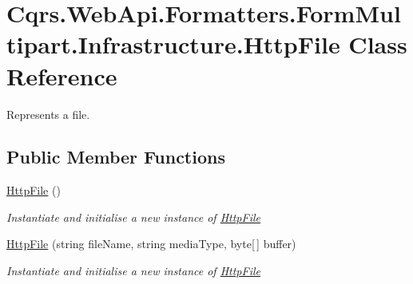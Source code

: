 \hypertarget{classCqrs_1_1WebApi_1_1Formatters_1_1FormMultipart_1_1Infrastructure_1_1HttpFile}{}\section{Cqrs.\+Web\+Api.\+Formatters.\+Form\+Multipart.\+Infrastructure.\+Http\+File Class Reference}
\label{classCqrs_1_1WebApi_1_1Formatters_1_1FormMultipart_1_1Infrastructure_1_1HttpFile}


Represents a file.  


\subsection*{Public Member Functions}
\begin{DoxyCompactItemize}
\item 
\hyperlink{classCqrs_1_1WebApi_1_1Formatters_1_1FormMultipart_1_1Infrastructure_1_1HttpFile_a27c8a6f375de51c5d5ff6d3602ab23c2_a27c8a6f375de51c5d5ff6d3602ab23c2}{Http\+File} ()
\begin{DoxyCompactList}\small\item\em Instantiate and initialise a new instance of \hyperlink{classCqrs_1_1WebApi_1_1Formatters_1_1FormMultipart_1_1Infrastructure_1_1HttpFile}{Http\+File} \end{DoxyCompactList}\item 
\hyperlink{classCqrs_1_1WebApi_1_1Formatters_1_1FormMultipart_1_1Infrastructure_1_1HttpFile_a725fbc81d5a60e8a85f4cf789907b934_a725fbc81d5a60e8a85f4cf789907b934}{Http\+File} (string file\+Name, string media\+Type, byte\mbox{[}$\,$\mbox{]} buffer)
\begin{DoxyCompactList}\small\item\em Instantiate and initialise a new instance of \hyperlink{classCqrs_1_1WebApi_1_1Formatters_1_1FormMultipart_1_1Infrastructure_1_1HttpFile}{Http\+File} \end{DoxyCompactList}\end{DoxyCompactItemize}
